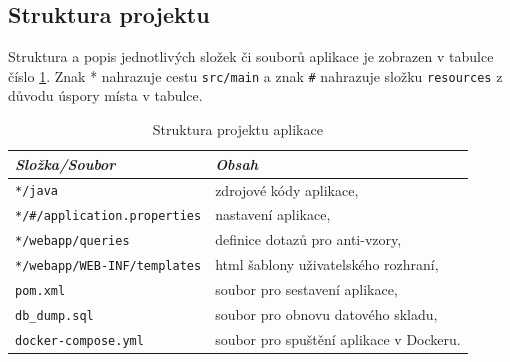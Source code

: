 \documentclass[czech,DP]{thesiskiv}
\begin{document}
\subsection{Struktura projektu}
Struktura a popis jednotlivých složek či souborů aplikace je zobrazen v tabulce číslo \ref{table:struktura_aplikace}. Znak * nahrazuje cestu \texttt{src/main} a znak \texttt{\#} nahrazuje složku \texttt{resources} z důvodu úspory místa v tabulce.
\begin{table}[ht]
	\caption{Struktura projektu aplikace} %
	\centering %
	\begin{tabular}{l l } %
		\textit{Složka/Soubor} &  \textit{Obsah}  \\ [0.5ex] %
		\hline %
		\texttt{*/java} & zdrojové kódy aplikace,  \\
		\texttt{*/\#/application.properties} & nastavení aplikace,  \\
		\texttt{*/webapp/queries} & definice dotazů pro anti-vzory,  \\
		\texttt{*/webapp/WEB-INF/templates} & html šablony uživatelského rozhraní,  \\
		\texttt{pom.xml} & soubor pro sestavení aplikace,  \\	
		\texttt{db\_dump.sql} &  soubor pro obnovu datového skladu,  \\
		\texttt{docker-compose.yml} & soubor pro spuštění aplikace v Dockeru.  \\	
		\hline %
	\end{tabular}
	\label{table:struktura_aplikace} %
\end{table}
\FloatBarrier
\end{document}
